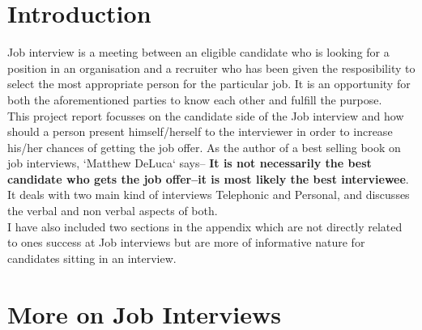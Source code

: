 \documentclass[a4paper,12pt]{report}
\begin{document}
\section{Introduction}             %
Job interview is a meeting between an eligible candidate who is looking for a position in an organisation and a recruiter who has been 
given the resposibility to select the most appropriate person for the particular job. It is an opportunity for both the aforementioned 
parties to know each other and fulfill the purpose. \\This project report focusses on the candidate side of the Job interview and how should a person
present himself/herself to the interviewer in order to increase his/her chances of getting the job offer.
As the author of a best selling book on job interviews, `Matthew DeLuca` \cite{matthewluca} says--
{\bf It is not necessarily the best candidate who gets the job offer--it is most likely the best interviewee}. It deals with two
main kind of interviews Telephonic and Personal, and discusses the verbal and non verbal aspects of both.\\
I have also included two sections in the appendix which are not directly related to ones success at Job interviews
but are more of informative nature for candidates sitting in an interview.
\section{More on Job Interviews}       %
\end{document}
